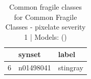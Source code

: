\begin{table}
\caption{Common fragile classes for Common Fragile Classes - pixelate severity 1 | Models: ()}
\label{tab:Common Fragile Classes - pixelate severity 1_d41d8cd9}
\begin{tabular}{cll}
\toprule
 & synset & label \\
\midrule
6 & n01498041 & stingray \\
\bottomrule
\end{tabular}
\end{table}
